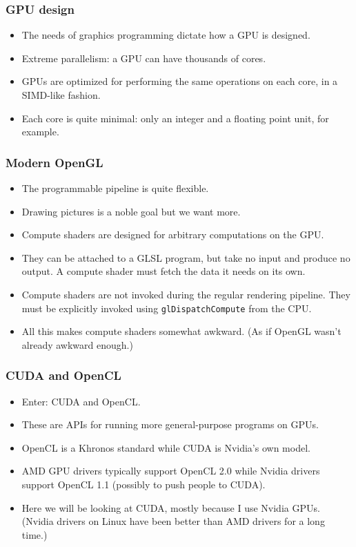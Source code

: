 \begin{frame}
  \frametitle{GPU design}
  \begin{itemize}
  \item The needs of graphics programming dictate how a GPU is designed.
  \item Extreme parallelism: a GPU can have thousands of cores.
  \item GPUs are optimized for performing the same operations on each core, in a
    SIMD-like fashion.
  \item Each core is quite minimal: only an integer and a floating point unit,
    for example.
  \end{itemize}
\end{frame}

\begin{frame}
  \frametitle{Modern OpenGL}
  \begin{itemize}
  \item The programmable pipeline is quite flexible.
  \item Drawing pictures is a noble goal but we want more.
  \item Compute shaders are designed for arbitrary computations on the GPU.
  \item They can be attached to a GLSL program, but take no input and produce no
    output. A compute shader must fetch the data it needs on its own.
  \item Compute shaders are not invoked during the regular rendering pipeline.
    They must be explicitly invoked using \texttt{glDispatchCompute} from the
    CPU.
  \item All this makes compute shaders somewhat awkward. (As if OpenGL wasn't
    already awkward enough.)
  \end{itemize}
\end{frame}

\begin{frame}
  \frametitle{CUDA and OpenCL}
  \begin{itemize}
  \item Enter: CUDA and OpenCL.
  \item These are APIs for running more general-purpose programs on GPUs.
  \item OpenCL is a Khronos standard while CUDA is Nvidia's own model.
  \item AMD GPU drivers typically support OpenCL 2.0 while Nvidia drivers
    support OpenCL 1.1 (possibly to push people to CUDA).
  \item Here we will be looking at CUDA, mostly because I use Nvidia GPUs.
    (Nvidia drivers on Linux have been better than AMD drivers for a long time.)
  \end{itemize}
\end{frame}

